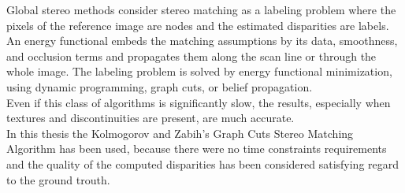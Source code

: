 Global stereo methods consider stereo matching as a labeling problem where the pixels of the reference image are nodes and the estimated disparities are labels. An energy functional embeds the matching assumptions by its data, smoothness, and occlusion terms and propagates them along the scan line or through the whole image. The labeling problem is solved by energy functional minimization, using dynamic programming, graph cuts, or belief propagation.\\
Even if this class of algorithms is significantly slow, the results, especially when textures and discontinuities are present, are much accurate.\\
\newline
In this thesis the Kolmogorov and Zabih's Graph Cuts Stereo Matching Algorithm has been used, because there were no time constraints requirements and the quality of the computed disparities has been considered satisfying regard to the ground trouth.\\
